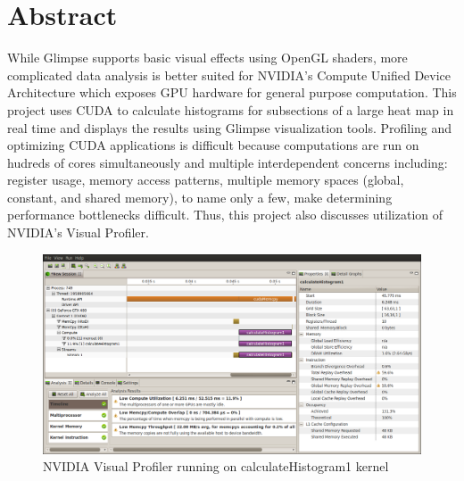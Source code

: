 \documentclass{article}
\begin{document}
\section{Abstract}\label{abstract}

While Glimpse supports basic visual effects using OpenGL shaders, more complicated data analysis is better suited for NVIDIA's Compute Unified Device Architecture\cite{cuda-zone} which exposes GPU hardware for general purpose computation. This project uses CUDA to calculate histograms for subsections of a large heat map in real time and displays the results using Glimpse visualization tools. Profiling and optimizing CUDA applications is difficult because computations are run on hudreds of cores simultaneously and multiple interdependent concerns including: register usage, memory access patterns, multiple memory spaces (global, constant, and shared memory), to name only a few, make determining performance bottlenecks difficult. Thus, this project also discusses utilization of NVIDIA's Visual Profiler\cite{nvidia-visual-profiler}.

\begin{figure}
\centering
\includegraphics[width=1.0\textwidth]{screenshots/nvvp/calculateHistogram1_screen1.png}
\caption{NVIDIA Visual Profiler running on calculateHistogram1 kernel}
\label{kernel1}
\end{figure}



\end{document}
